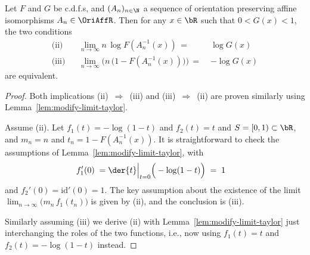 \begin{lemma}
  \label{lem:taylored-ev-limit}
  \leanok
  Let $F$ and $G$ be c.d.f.s, and $(A_n)_{n \in \N}$ a sequence of orientation
  preserving affine isomorphisms $A_n \in \OriAffR$. Then for any $x \in \bR$
  such that $0 < G(x) < 1$, the two conditions
  \begin{align*}
    \text{(ii)} & & \lim_{n \to \infty} n \, \log F (A_n^{-1}(x)) \, = \; & \log G(x) \\
    \text{(iii)} & & \lim_{n \to \infty} \Big( n \, \big(1 - F (A_n^{-1}(x)) \big) \Big)
      \, = \; & - \log G(x)
  \end{align*}
  are equivalent.
\end{lemma}
\begin{proof}

  Both implications {(ii) $\, \Rightarrow \,$ (iii)} and {(iii) $\, \Rightarrow \,$ (ii)}
  are proven similarly using Lemma~\ref{lem:modify-limit-taylor}.

  Assume (ii). Let $f_1(t) = - \log (1-t)$ and $f_2(t) = t$ and
  $S = [0,1) \subset \bR$, and $m_n = n$ and $t_n = 1 - F (A_n^{-1}(x))$.
  It is straightforward to check the assumptions of Lemma~\ref{lem:modify-limit-taylor},
  with
  \begin{align*}
    f_1'(0) \; = \; & \der{t} \Big|_{t=0} \Big( - \log (1 - t) \Big) \; = \; 1
  \end{align*}
  and $f_2'(0) = \mathrm{id}'(0) = 1$.
  The key assumption about the existence of
  the limit $\lim_{n \to \infty} \big( m_n \, f_1(t_n) \big)$ is given by (ii),
  and the conclusion is (iii).

  Similarly assuming (iii) we derive (ii) with Lemma~\ref{lem:modify-limit-taylor}
  just interchanging the roles of the two functions, i.e., now using
  $f_1(t) = t$ and $f_2(t) = - \log (1-t)$ instead.
\end{proof}

